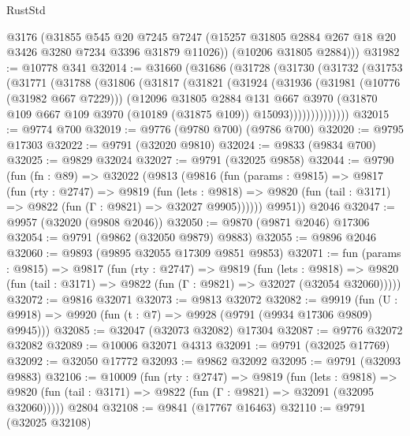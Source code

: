 \begin{lexlean}{RustStd}
\begin{coremodule}
        @3176
        (@31855
          @545
          @20
          @7245
          @7247
          (@15257 @31805 @2884 @267 @18 @20 @3426 @3280 @7234 @3396 @31879 @11026))
        (@10206 @31805 @2884)))
@31982 := @10778 @341
@32014 := @31660
    (@31686
      (@31728
        (@31730
          (@31732
            (@31753
              (@31771
                (@31788
                  (@31806
                    (@31817
                      (@31821
                        (@31924
                          (@31936
                            (@31981 (@10776 (@31982 @667 @7229)))
                            (@12096
                              @31805
                              @2884
                              @131
                              @667
                              @3970
                              (@31870
                                @109
                                @667
                                @109
                                @3970
                                (@10189 (@31875 @109))
                                @15093))))))))))))))
@32015 := @9774 @700
@32019 := @9776 (@9780 @700) (@9786 @700)
@32020 := @9795 @17303
@32022 := @9791 (@32020 @9810)
@32024 := @9833 (@9834 @700)
@32025 := @9829 @32024
@32027 := @9791 (@32025 @9858)
@32044 := @9790
    (fun (fn : @89) =>
    @32022
      (@9813
        (@9816
          (fun (params : @9815) =>
          @9817
            (fun (rty : @2747) =>
            @9819
              (fun (lets : @9818) =>
              @9820 (fun (tail : @3171) => @9822 (fun (Γ : @9821) => @32027 @9905))))))
        @9951))
    @2046
@32047 := @9957 (@32020 (@9808 @2046))
@32050 := @9870 (@9871 @2046) @17306
@32054 := @9791 (@9862 (@32050 @9879) @9883)
@32055 := @9896 @2046
@32060 := @9893 (@9895 @32055 @17309 @9851 @9853)
@32071 := fun (params : @9815) =>
  @9817
    (fun (rty : @2747) =>
    @9819
      (fun (lets : @9818) =>
      @9820 (fun (tail : @3171) => @9822 (fun (Γ : @9821) => @32027 (@32054 @32060)))))
@32072 := @9816 @32071
@32073 := @9813 @32072
@32082 := @9919
    (fun (U : @9918) => @9920 (fun (t : @7) => @9928 (@9791 (@9934 @17306 @9809) @9945)))
@32085 := @32047 (@32073 @32082) @17304
@32087 := @9776 @32072 @32082
@32089 := @10006 @32071 @4313
@32091 := @9791 (@32025 @17769)
@32092 := @32050 @17772
@32093 := @9862 @32092
@32095 := @9791 (@32093 @9883)
@32106 := @10009
    (fun (rty : @2747) =>
    @9819
      (fun (lets : @9818) =>
      @9820 (fun (tail : @3171) => @9822 (fun (Γ : @9821) => @32091 (@32095 @32060)))))
    @2804
@32108 := @9841 (@17767 @16463)
@32110 := @9791 (@32025 @32108)

\end{coremodule}
\end{lexlean}
